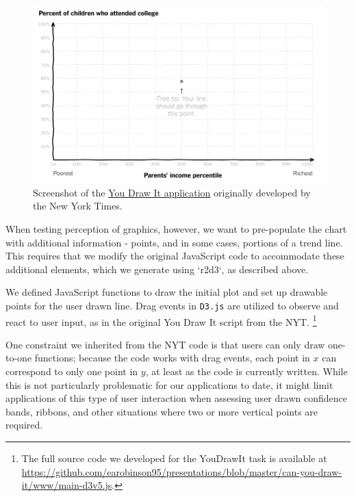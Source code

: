 \documentclass[
  letterpaper,
  DIV=11,
  numbers=noendperiod]{scrartcl}
\newcommand{\svp}[1]{{\textcolor{RedOrange}{#1}}}
\begin{document}
\begin{figure}

{\centering \includegraphics{images/NYT-You-Draw-It-Screenshot.png}

}

\caption{\label{fig-nyt-screenshot}Screenshot of the
\href{https://www.nytimes.com/interactive/2015/05/28/upshot/you-draw-it-how-family-income-affects-childrens-college-chances.html}{You
Draw It application} originally developed by the New York Times.}

\end{figure}

\svp{When testing perception of graphics, however, we want to pre-populate the chart with additional information - points, and in some cases, portions of a trend line. This requires that we modify the original JavaScript code to accommodate these additional elements, which we generate using `r2d3`, as described above.}

We defined JavaScript functions to draw the initial plot and set up
drawable points for the user drawn line. Drag events in \texttt{D3.js}
are utilized to observe and react to user input,
\svp{as in the original You Draw It script from the NYT}. \footnote{The
  full source code we developed for the YouDrawIt task is available at
  \url{https://github.com/earobinson95/presentations/blob/master/can-you-draw-it/www/main-d3v5.js}.}

\svp{One constraint we inherited from the NYT code is that users can only draw one-to-one functions; because the code works with drag events, each point in $x$ can correspond to only one point in $y$, at least as the code is currently written. While this is not particularly problematic for our applications to date, it might limit applications of this type of user interaction when assessing user drawn confidence bands, ribbons, and other situations where two or more vertical points are required.}
\end{document}
